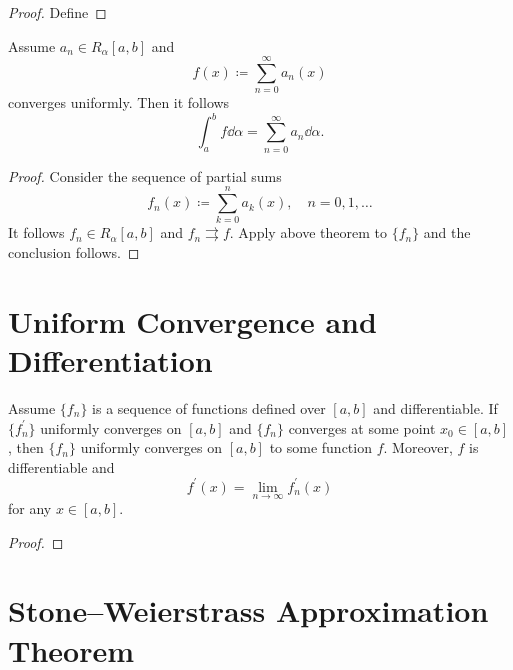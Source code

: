 \begin{proof}
Define
\end{proof}

\begin{corollary}
Assume $a_n\in R_\alpha[a,b]$ and
\[ f(x)\coloneqq\sum_{n=0}^\infty a_n(x) \]
converges uniformly. Then it follows
\[ \int_a^bf\dd{\alpha}=\sum_{n=0}^\infty a_n\dd{\alpha}. \]
\end{corollary}

\begin{proof}
Consider the sequence of partial sums 
\[ f_n(x)\coloneqq\sum_{k=0}^na_k(x), \quad n=0,1,\dots \]
It follows $f_n\in R_\alpha[a,b]$ and $f_n\rightrightarrows f$. Apply above theorem to $\{f_n\}$ and the conclusion follows.
\end{proof}

\section{Uniform Convergence and Differentiation}
\begin{theorem}
Assume $\{f_n\}$ is a sequence of functions defined over $[a,b]$ and differentiable. If $\{f_n^\prime\}$ uniformly converges on $[a,b]$ and $\{f_n\}$ converges at some point $x_0\in[a,b]$, then $\{f_n\}$ uniformly converges on $[a,b]$ to some function $f$. Moreover, $f$ is differentiable and
\[ f^\prime(x)=\lim_{n\to\infty}f_n^\prime(x) \]
for any $x\in[a,b]$.
\end{theorem}

\begin{proof}

\end{proof}

\section{Stone--Weierstrass Approximation Theorem}
